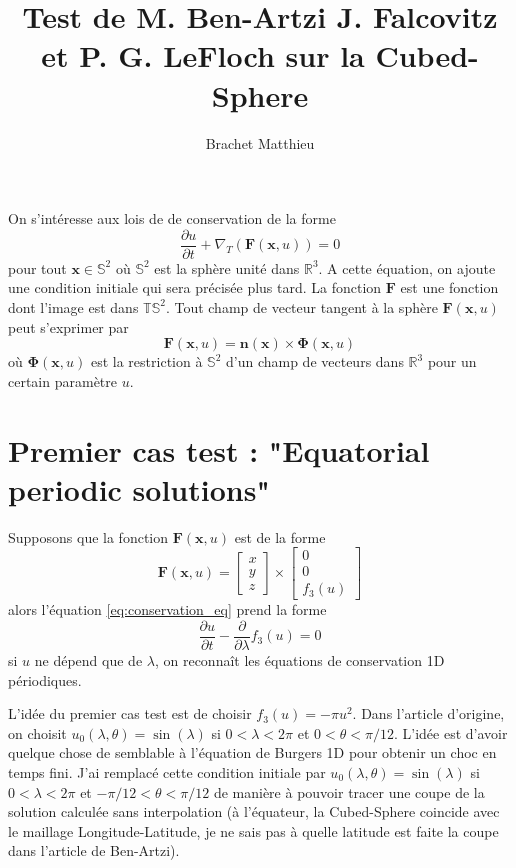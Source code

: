 \documentclass[10pt,a4paper]{article}
\author{Brachet Matthieu}
\title{Test  de M. Ben-Artzi J. Falcovitz et P. G. LeFloch sur la Cubed-Sphere}
\begin{document}
\maketitle

On s'intéresse aux lois de de conservation de la forme 
\begin{equation}
\dfrac{\partial u}{\partial t} + \nabla_T (\mathbf{F}(\mathbf{x},u)) = 0
\label{eq:conservation_eq}
\end{equation}
pour tout $\mathbf{x} \in \mathbb{S}^2$ où $\mathbb{S}^2$ est la sphère unité dans $\mathbb{R}^3$. A cette équation, on ajoute une condition initiale qui sera précisée plus tard.
La fonction $\mathbf{F}$ est une fonction dont l'image est dans $\mathbb{T}\mathbb{S}^2$. Tout champ de vecteur tangent à la sphère $\mathbf{F}(\mathbf{x},u)$ peut s'exprimer par
\begin{equation}
\mathbf{F}(\mathbf{x},u) = \mathbf{n}(\mathbf{x}) \times \mathbf{\Phi}(\mathbf{x},u)
\end{equation}
où $\mathbf{\Phi}(\mathbf{x},u)$ est la restriction à $\mathbb{S}^2$ d'un champ de vecteurs dans $\mathbb{R}^3$ pour un certain paramètre $u$. 

\section{Premier cas test : "Equatorial periodic solutions"}
Supposons que la fonction $\mathbf{F}(\mathbf{x},u)$ est de la forme 
\begin{equation}
\mathbf{F}(\mathbf{x},u) = 
\begin{bmatrix}
x \\ y \\ z 
\end{bmatrix} \times
\begin{bmatrix}
0 \\ 0 \\ f_3(u) 
\end{bmatrix}
\end{equation}
alors l'équation \eqref{eq:conservation_eq} prend la forme
\begin{equation}
\dfrac{\partial u}{\partial t} - \dfrac{\partial}{\partial \lambda} f_3(u) = 0
\end{equation}
si $u$ ne dépend que de $\lambda$, on reconnaît les équations de conservation 1D périodiques.

L'idée du premier cas test est de choisir $f_3(u) = -\pi u^2$.
Dans l'article d'origine, on choisit $u_0(\lambda,\theta) = \sin ( \lambda )$ si $0 < \lambda < 2 \pi$ et $0 < \theta < \pi/12$. L'idée est d'avoir quelque chose de semblable à l'équation de Burgers 1D pour obtenir un choc en temps fini. 
J'ai remplacé cette condition initiale par $u_0(\lambda,\theta) = \sin ( \lambda )$ si $0 < \lambda < 2 \pi$ et $- \pi/12 < \theta < \pi/12$ de manière à pouvoir tracer une coupe de la solution calculée sans interpolation (à l'équateur, la Cubed-Sphere coincide avec le maillage Longitude-Latitude, je ne sais pas à quelle latitude est faite la coupe dans l'article de Ben-Artzi).
\end{document}
